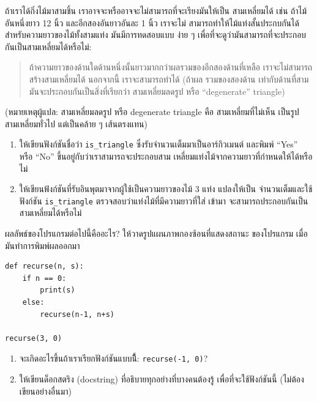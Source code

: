 \begin{exercise}

ถ้าเราได้กิ่งไม้มาสามชิ้น เราอาจจะหรืออาจจะไม่สามารถที่จะเรียงมันให้เป็น
สามเหลี่ยมได้ เช่น ถ้าไม้อันหนึ่งยาว 12 นิ้ว และอีกสองอันยาวอันละ 1 นิ้ว เราจะไม่
สามารถทำให้ไม้แท่งสั้นประกบกันได้ สำหรับความยาวของไม้ทั้งสามแท่ง มันมีการทดสอบแบบ
ง่าย ๆ เพื่อที่จะดูว่ามันสามารถที่จะประกอบกันเป็นสามเหลี่ยมได้หรือไม่:

\begin{quotation}
ถ้าความยาวของด้านใดด้านหนึ่งนั้นยาวมากกว่าผลรวมของอีกสองด้านที่เหลือ 
เราจะไม่สามารถสร้างสามเหลี่ยมได้ นอกจากนี้ เราจะสามารถทำได้ (ถ้าผล
รวมของสองด้าน เท่ากับด้านที่สาม มันจะประกอบกันเป็นสิ่งที่เรียกว่า 
สามเหลี่ยมลดรูป หรือ ``degenerate'' triangle)
\end{quotation}

(หมายเหตุผู้แปล: สามเหลี่ยมลดรูป หรือ degenerate triangle คือ สามเหลี่ยมที่ไม่เห็น
เป็นรูปสามเหลี่ยมทั่วไป แต่เป็นคล้าย ๆ เส้นตรงแทน)

\begin{enumerate}

\item ให้เขียนฟังก์ชันชื่อว่า \verb"is_triangle" ซึ่งรับจำนวนเต็มมาเป็นอาร์กิวเมนต์ 
และพิมพ์ ``Yes'' หรือ ``No'' ขึ้นอยู่กับว่าเราสามารถจะประกอบสาม
เหลี่ยมแท่งไม้จากความยาวที่กำหนดให้ได้หรือไม่ 

\item ให้เขียนฟ้งก์ชันที่รับอินพุตมาจากผู้ใช้เป็นความยาวของไม้ 3 แท่ง แปลงให้เป็น
จำนวนเต็มและใช้ฟังก์ชัน \verb"is_triangle" ตรวจสอบว่าแท่งไม้ที่มีความยาวที่ใส่
เข้ามา จะสามารถประกอบกันเป็นสามเหลี่ยมได้หรือไม่

\end{enumerate}

\end{exercise}

\begin{exercise}
ผลลัพธ์ของโปรแกรมต่อไปนี้คืออะไร? ให้วาดรูปแผนภาพกองซ้อนที่แสดงสถานะ 
ของโปรแกรม เมื่อมันทำการพิมพ์ผลออกมา

\begin{verbatim}
def recurse(n, s):
    if n == 0:
        print(s)
    else:
        recurse(n-1, n+s)

recurse(3, 0)
\end{verbatim}

\begin{enumerate}

\item จะเกิดอะไรขึ้นถ้าเราเรียกฟังก์ชันแบบนี้ีี: {\tt   recurse(-1, 0)}?

\item ให้เขียนด็อกสตริง (docstring) ที่อธิบายทุกอย่างที่บางคนต้องรู้
เพื่อที่จะใช้ฟังก์ชันนี้ (ไม่ต้องเขียนอย่างอื่นมา)

\end{enumerate}

\end{exercise}


